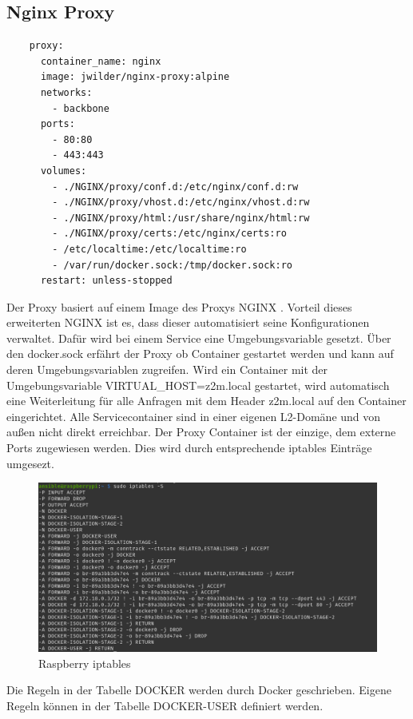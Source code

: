 \subsection{Nginx Proxy}
\begin{lstlisting}
    proxy:
      container_name: nginx
      image: jwilder/nginx-proxy:alpine
      networks:
        - backbone
      ports:
        - 80:80
        - 443:443
      volumes:
        - ./NGINX/proxy/conf.d:/etc/nginx/conf.d:rw
        - ./NGINX/proxy/vhost.d:/etc/nginx/vhost.d:rw
        - ./NGINX/proxy/html:/usr/share/nginx/html:rw
        - ./NGINX/proxy/certs:/etc/nginx/certs:ro
        - /etc/localtime:/etc/localtime:ro
        - /var/run/docker.sock:/tmp/docker.sock:ro
      restart: unless-stopped
\end{lstlisting}

Der Proxy basiert auf einem Image des Proxys NGINX \cite{nginxpm}. Vorteil dieses erweiterten NGINX ist es,
dass dieser automatisiert seine Konfigurationen verwaltet. Dafür wird bei einem Service eine Umgebungsvariable gesetzt. Über den 
\grqq docker.sock\grqq{} erfährt der Proxy ob Container gestartet werden und kann auf deren Umgebungsvariablen zugreifen. Wird ein Container mit der Umgebungsvariable 
\grqq VIRTUAL\_HOST=z2m.local \grqq{} gestartet, wird automatisch eine Weiterleitung für alle Anfragen mit dem Header \grqq z2m.local\grqq{} auf den Container eingerichtet.
Alle Servicecontainer sind in einer eigenen L2-Domäne und von außen nicht direkt erreichbar. Der Proxy Container ist der einzige, dem externe Ports zugewiesen werden.
Dies wird durch entsprechende \grqq iptables\grqq{} Einträge umgesezt.

\begin{figure}[H]
  \centering
  \includegraphics[width=1\textwidth]{media/rasp-iptables.png}
  \caption{Raspberry iptables}
\end{figure}
Die Regeln in der Tabelle \grqq DOCKER \grqq{} werden durch Docker geschrieben. Eigene Regeln können in der Tabelle 
\grqq DOCKER-USER \grqq{} definiert werden.

